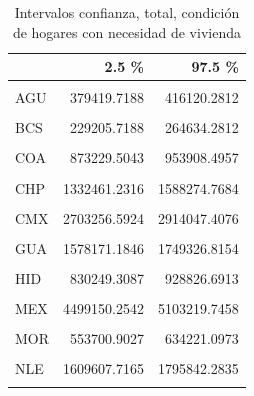 \documentclass[
]{article}
\begin{document}
\begin{table}[H]

\caption{\label{tab:unnamed-chunk-17}Intervalos confianza, total,
    condición de hogares con necesidad de vivienda}
\centering
\begin{tabular}[t]{lrr}
\toprule
  & 2.5 \% & 97.5 \%\\
\midrule
\cellcolor{gray!6}{Nivel nacional} & \cellcolor{gray!6}{35719964.9960} & \cellcolor{gray!6}{36700969.0040}\\
AGU & 379419.7188 & 416120.2812\\
\cellcolor{gray!6}{BCN} & \cellcolor{gray!6}{1096420.0194} & \cellcolor{gray!6}{1216635.9806}\\
BCS & 229205.7188 & 264634.2812\\
\cellcolor{gray!6}{CAM} & \cellcolor{gray!6}{242732.2152} & \cellcolor{gray!6}{282245.7848}\\
\addlinespace
COA & 873229.5043 & 953908.4957\\
\cellcolor{gray!6}{COL} & \cellcolor{gray!6}{217392.3744} & \cellcolor{gray!6}{251151.6256}\\
CHP & 1332461.2316 & 1588274.7684\\
\cellcolor{gray!6}{CHH} & \cellcolor{gray!6}{1105077.6198} & \cellcolor{gray!6}{1190256.3802}\\
CMX & 2703256.5924 & 2914047.4076\\
\addlinespace
\cellcolor{gray!6}{DUR} & \cellcolor{gray!6}{482753.8236} & \cellcolor{gray!6}{531562.1764}\\
GUA & 1578171.1846 & 1749326.8154\\
\cellcolor{gray!6}{GRO} & \cellcolor{gray!6}{912201.9652} & \cellcolor{gray!6}{1026772.0348}\\
HID & 830249.3087 & 928826.6913\\
\cellcolor{gray!6}{JAL} & \cellcolor{gray!6}{2266917.8367} & \cellcolor{gray!6}{2502974.1633}\\
\addlinespace
MEX & 4499150.2542 & 5103219.7458\\
\cellcolor{gray!6}{MIC} & \cellcolor{gray!6}{1244553.3809} & \cellcolor{gray!6}{1436554.6191}\\
MOR & 553700.9027 & 634221.0973\\
\cellcolor{gray!6}{NAY} & \cellcolor{gray!6}{344670.3625} & \cellcolor{gray!6}{384897.6375}\\
NLE & 1609607.7165 & 1795842.2835\\
\addlinespace
\cellcolor{gray!6}{OAX} & \cellcolor{gray!6}{1053550.5350} & \cellcolor{gray!6}{1262279.4650}\\

\end{tabular}
\end{table}
\end{document}

